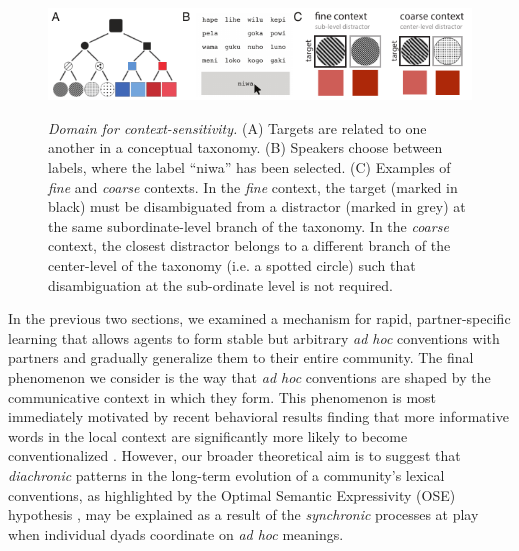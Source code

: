 
\begin{figure}[t]
\begin{center}
{\includegraphics[scale=1.6]{./figures/Sec2-design.pdf}}
{\caption{{\emph{Domain for context-sensitivity.} (A) Targets are related to one another in a conceptual taxonomy. (B) Speakers choose between labels, where the label ``niwa'' has been selected. (C) Examples of \emph{fine} and \emph{coarse} contexts. In the \emph{fine} context, the target (marked in black) must be disambiguated from a distractor (marked in grey) at the same subordinate-level branch of the taxonomy.  In the \emph{coarse} context, the closest distractor belongs to a different branch of the center-level of the taxonomy (i.e. a spotted circle) such that disambiguation at the sub-ordinate level is not required. \label{fig:context_design}}}}
\end{center}
\end{figure}

In the previous two sections, we examined a mechanism for rapid, partner-specific learning that allows agents to form stable but arbitrary \emph{ad hoc} conventions with partners and gradually generalize them to their entire community. 
The final phenomenon we consider is the way that \emph{ad hoc} conventions are shaped by the communicative context in which they form.
This phenomenon is most immediately motivated by recent behavioral results finding that more informative words in the local context are significantly more likely to become conventionalized \cite{hawkins2020characterizing}.
However, our broader theoretical aim is to suggest that \emph{diachronic} patterns in the long-term evolution of a community's lexical conventions, as highlighted by the Optimal Semantic Expressivity (OSE) hypothesis \cite{frankblogpost}, may be explained as a result of the \emph{synchronic} processes at play when individual dyads coordinate on  \emph{ad hoc} meanings.


